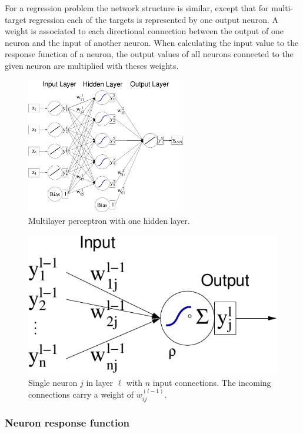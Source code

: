 For a regression problem the network structure is similar, except that
for multi-target regression each of the targets is represented by one
output neuron.
A weight is associated to each directional connection between the output
of one neuron and the input of another neuron.  When calculating the input
value to the response function of a neuron, the output values of all
neurons connected to the given neuron are multiplied with theses weights.
\begin{figure}[t]
  \centering
  \includegraphics[width=0.62\textwidth]{plots/MLP}
  \caption[.]{Multilayer perceptron with one hidden layer.}
  \label{fig:mlp:nw}
\end{figure}
\begin{figure}[t]
  \centering
  \includegraphics[width=.30\textwidth]{plots/MLP_SingleNode}
  \caption[.]{Single neuron $j$ in layer $\ell$ with $n$ input connections. The
    incoming connections carry a weight of $w_{ij}^{(l-1)}$.}
  \label{fig:mlp:node}
\end{figure}

\subsubsection*{Neuron response function}

